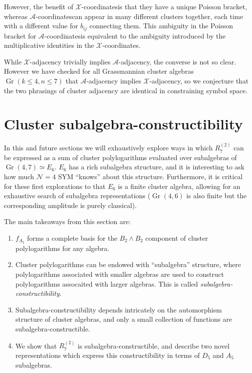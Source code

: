 \documentclass[11pt]{article}
\DeclareMathOperator{\Gr}{Gr}
\def\x{\mathcal{X}}
\def\xcoords{$\mathcal{X}$-coordinates}
\def\a{\mathcal{A}}
\def\acoords{$\mathcal{A}$-coordinates}
\def\flag{{\huge \color{red} \textinterrobang}}
\begin{document}
However, the benefit of \xcoords is that they have a unique Poisson bracket, whereas \acoords can appear in many different clusters together, each time with a different value for $b_{ij}$ connecting them. This ambiguity in the Poisson bracket for \acoords is equivalent to the ambiguity introduced by the multiplicative identities in the \xcoords.  

While $\x$-adjacency trivially implies $\a$-adjacency, the converse is not so clear. However we have checked for all Grassmannian cluster algebras $\Gr(k\le4,n\le7)$ that $\a$-adjacency implies $\x$-adjacency, so we conjecture that the two phrasings of cluster adjacency are identical in constraining symbol space. \flag

\section{Cluster subalgebra-constructibility}\label{sec:sub-constructibility} 

In this and future sections we will exhaustively explore ways in which $R^{(2)}_{7}$ can be expressed as a sum of cluster polylogarithms evaluated over subalgebras of $\Gr(4,7) \simeq E_6$. $E_6$ has a rich subalgebra structure, and it is interesting to ask how much $\mathcal{N}=4$ SYM ``knows'' about this structure. Furthermore, it is critical for these first explorations to that $E_6$ is a finite cluster algebra, allowing for an exhaustive search of subalgebra representations ($\Gr(4,6)$ is also finite but the corresponding amplitude is purely classical).

The main takeaways from this section are:
\begin{enumerate}
	\item $f_{A_2}$ forms a complete basis for the $B_2 \wedge B_2$ component of cluster polylogarithms for any algebra. 
	\item Cluster polylogarithms can be endowed with ``subalgebra'' structure, where polylogarithms associated with smaller algebras are used to construct polylogarithms assocaited with larger algebras. This is called \emph{subalgebra-constructibility}.
	\item Subalgebra-constructibility depends intricately on the automorphism structure of cluster algebras, and only a small collection of functions are subalgebra-constructible. 
	\item We show that $R^{(2)}_7$ is subalgebra-constructible, and describe two novel representations which express this constructibility in terms of $D_5$ and $A_5$ subalgebras. 
\end{enumerate}
\end{document}
